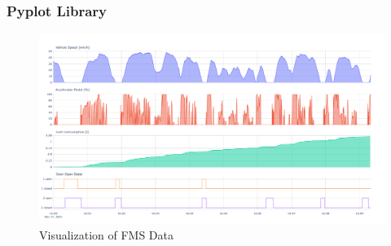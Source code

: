 \newpage
\subsubsection{Pyplot Library}

\bigskip
\begin{figure}[h!]
	\centering
	\hfuzz=15.0pt
	\includegraphics[width=15cm]{images/FMS_Data_Visualization.pdf}
	\caption{Visualization of FMS Data}
	\label{fig:fms_visualization}
\end{figure}
\newpage
